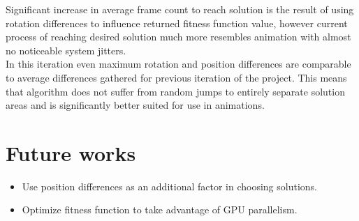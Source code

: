 \documentclass[]{report}
\begin{document}
\noindent Significant increase in average frame count to reach solution is the result of using rotation differences to influence returned fitness function value, however current process of reaching desired solution much more resembles animation with almost no noticeable system jitters.\\

\noindent In this iteration even maximum rotation and position differences are comparable to average differences gathered for previous iteration of the project. This means that algorithm does not suffer from random jumps to entirely separate solution areas and is significantly better suited for use in animations.

\chapter*{Future works}
\begin{itemize}
\item Use position differences as an additional factor in choosing solutions.
\item Optimize fitness function to take advantage of GPU parallelism.
\end{itemize}
\end{document}
